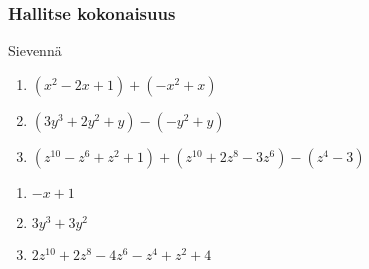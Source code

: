 
\subsubsection*{Hallitse kokonaisuus}

\begin{tehtava}
    Sievennä
    \begin{enumerate}
        \item $(x^2 - 2x + 1) + (-x^2 + x) $
        \item $(3y^3 + 2y^2  + y) - (-y^2 + y)$
        \item $(z^{10} - z^6 + z^2 + 1) + (z^{10} + 2z^8 - 3z^6) - (z^4 - 3)$
    \end{enumerate}
    \begin{vastaus}
        \begin{enumerate}
            \item $-x + 1$
            \item $3y^3 + 3y^2$
            \item $2z^{10} + 2z^8 - 4z^6 - z^4 + z^2 + 4$
        \end{enumerate}
    \end{vastaus}
\end{tehtava}


